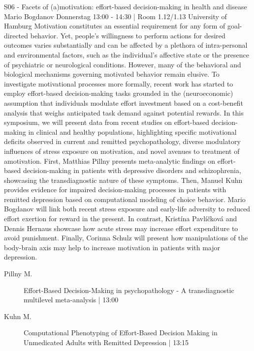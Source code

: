 
            \begin{symposium}
            {S06 - Facets of (a)motivation: effort-based decision-making in health and disease }
            {Mario Bogdanov}
            {Donnerstag 13:00 - 14:30 | Room 1.12/1.13}
            {University of Hamburg}
            Motivation constitutes an essential requirement for any form of goal-directed behavior. Yet, people’s willingness to perform actions for desired outcomes varies substantially and can be affected by a plethora of intra-personal and environmental factors, such as the individual’s affective state or the presence of psychiatric or neurological conditions. However, many of the behavioral and biological mechanisms governing motivated behavior remain elusive. To investigate motivational processes more formally, recent work has started to employ effort-based decision-making tasks grounded in the (neuroeconomic) assumption that individuals modulate effort investment based on a cost-benefit analysis that weighs anticipated task demand against potential rewards. In this symposium, we will present data from recent studies on effort-based decision-making in clinical and healthy populations, highlighting specific motivational deficits observed in current and remitted psychopathology, diverse modulatory influences of stress exposure on motivation, and novel avenues to treatment of amotivation. First, Matthias Pillny presents meta-analytic findings on effort-based decision-making in patients with depressive disorders and schizophrenia, showcasing the transdiagnostic nature of these symptoms. Then, Manuel Kuhn provides evidence for impaired decision-making processes in patients with remitted depression based on computational modeling of choice behavior. Mario Bogdanov will link both recent stress exposure and early-life adversity to reduced effort exertion for reward in the present. In contrast, Kristína Pavlíčková and Dennis Hernaus showcase how acute stress may increase effort expenditure to avoid punishment. Finally, Corinna Schulz will present how manipulations of the body-brain axis may help to increase motivation in patients with major depression.
            \begin{description}    
            
                \item [ Pillny M.] Effort-Based Decision-Making in psychopathology - A transdiagnostic multilevel meta-analysis \textcolor{mygray}{ | 13:00}    
                
                \item [ Kuhn M.] Computational Phenotyping of Effort-Based Decision Making in Unmedicated Adults with Remitted Depression \textcolor{mygray}{ | 13:15}    
                

\end{description}
\end{symposium}

